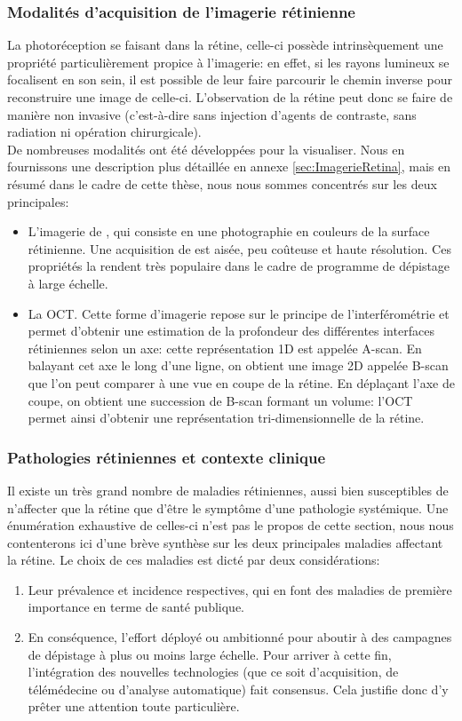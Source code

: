 \subsubsection{Modalités d'acquisition de l'imagerie rétinienne}
La photoréception se faisant dans la rétine, celle-ci possède intrinsèquement une propriété particulièrement propice à l'imagerie: en effet, si les rayons lumineux se focalisent en son sein, il est possible de leur faire parcourir le chemin inverse pour reconstruire une image de celle-ci. L'observation de la rétine peut donc se faire de manière non invasive (c'est-à-dire sans injection d'agents de contraste, sans radiation ni opération chirurgicale). \\
De nombreuses modalités ont été développées pour la visualiser. Nous en fournissons une description plus détaillée en annexe \ref{sec:ImagerieRetina}, mais en résumé dans le cadre de cette thèse, nous nous sommes concentrés sur les deux principales:
\begin{itemize}
	\item L'imagerie de \fundus{}, qui consiste en une photographie en couleurs de la surface rétinienne. Une acquisition de \fundus{} est aisée, peu coûteuse et haute résolution. Ces propriétés la rendent très populaire dans le cadre de programme de dépistage à large échelle.
	\item La \acf{OCT}. Cette forme d'imagerie repose sur le principe de l'interférométrie et permet d'obtenir une estimation de la profondeur des différentes interfaces rétiniennes selon un axe: cette représentation 1D est appelée A-scan. En balayant cet axe le long d'une ligne, on obtient une image 2D appelée  B-scan que l'on peut comparer à une vue en coupe de la rétine. En déplaçant l'axe de coupe, on obtient une succession de B-scan formant un volume: l'OCT permet ainsi d'obtenir une représentation tri-dimensionnelle de la rétine.
\end{itemize}

\subsubsection{Pathologies rétiniennes et contexte clinique}
Il existe un très grand nombre de maladies rétiniennes, aussi bien susceptibles de n'affecter que la rétine que d'être le symptôme d'une pathologie systémique. Une énumération exhaustive de celles-ci n'est pas le propos de cette section, nous nous contenterons ici d'une brève synthèse sur les deux principales maladies affectant la rétine. Le choix de ces maladies est dicté par deux considérations:
\begin{enumerate}
	\item Leur prévalence et incidence respectives, qui en font des maladies de première importance en terme de santé publique.
	\item En conséquence, l'effort déployé ou ambitionné pour aboutir à des campagnes de dépistage à plus ou moins large échelle. Pour arriver à cette fin, l'intégration des nouvelles technologies (que ce soit d'acquisition, de télémédecine ou d'analyse automatique) fait consensus. Cela justifie donc d'y prêter une attention toute particulière.
\end{enumerate}

